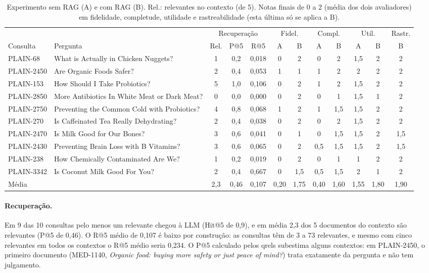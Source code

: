 \documentclass[11pt,a4paper]{article}
\begin{document}
\begin{table}[!htb]
\centering\footnotesize
\setlength{\tabcolsep}{3pt}
\caption{Experimento sem RAG (A) e com RAG (B). Rel.: relevantes no contexto (de 5). Notas finais de 0 a 2 (média dos dois avaliadores) em fidelidade, completude, utilidade e rastreabilidade (esta última só se aplica a B).}
\label{tab:rag}
\begin{tabular}{llcccccccccc}
\toprule
 & & \multicolumn{3}{c}{Recuperação} & \multicolumn{2}{c}{Fidel.} & \multicolumn{2}{c}{Compl.} & \multicolumn{2}{c}{Util.} & Rastr. \\
\cmidrule(lr){3-5}\cmidrule(lr){6-7}\cmidrule(lr){8-9}\cmidrule(lr){10-11}\cmidrule(lr){12-12}
Consulta & Pergunta & Rel. & P@5 & R@5 & A & B & A & B & A & B & B \\
\midrule
PLAIN-68 & What is Actually in Chicken Nuggets? & 1 & 0,2 & 0,018 & 0 & 2 & 0 & 2 & 1,5 & 2 & 2 \\
PLAIN-2450 & Are Organic Foods Safer? & 2 & 0,4 & 0,053 & 1 & 1 & 1 & 2 & 2 & 2 & 2 \\
PLAIN-153 & How Should I Take Probiotics? & 5 & 1,0 & 0,106 & 0 & 2 & 1 & 2 & 1,5 & 2 & 2 \\
PLAIN-2850 & More Antibiotics In White Meat or Dark Meat? & 0 & 0,0 & 0,000 & 0 & 2 & 0 & 1 & 1,5 & 1 & 2 \\
PLAIN-2750 & Preventing the Common Cold with Probiotics? & 4 & 0,8 & 0,068 & 1 & 2 & 1 & 1,5 & 1,5 & 2 & 2 \\
PLAIN-270 & Is Caffeinated Tea Really Dehydrating? & 2 & 0,4 & 0,038 & 0 & 2 & 0 & 2 & 1,5 & 2 & 2 \\
PLAIN-2470 & Is Milk Good for Our Bones? & 3 & 0,6 & 0,041 & 0 & 1 & 0 & 1,5 & 1,5 & 2 & 1,5 \\
PLAIN-2430 & Preventing Brain Loss with B Vitamins? & 3 & 0,6 & 0,065 & 0 & 2 & 0,5 & 1,5 & 1,5 & 2 & 1,5 \\
PLAIN-238 & How Chemically Contaminated Are We? & 1 & 0,2 & 0,019 & 0 & 2 & 0 & 1 & 1 & 2 & 2 \\
PLAIN-3342 & Is Coconut Milk Good For You? & 2 & 0,4 & 0,667 & 0 & 1,5 & 0,5 & 1,5 & 2 & 1 & 2 \\
\midrule
Média & & 2,3 & 0,46 & 0,107 & 0,20 & 1,75 & 0,40 & 1,60 & 1,55 & 1,80 & 1,90 \\
\bottomrule
\end{tabular}
\end{table}

\paragraph{Recuperação.} Em 9 das 10 consultas pelo menos um relevante chegou à LLM (Hit@5 de 0,9), e em média 2,3 dos 5 documentos do contexto são relevantes (P@5 de 0,46). O R@5 médio de 0,107 é baixo por construção: as consultas têm de 3 a 73 relevantes, e mesmo com cinco relevantes em todos os contextos o R@5 médio seria 0,234. O P@5 calculado pelos qrels subestima alguns contextos: em PLAIN-2450, o primeiro documento (MED-1140, \emph{Organic food: buying more safety or just peace of mind?}) trata exatamente da pergunta e não tem julgamento.
\end{document}
